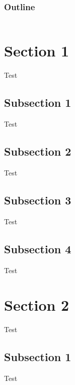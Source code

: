 \documentclass[compress,14pt,t]{beamer}
\begin{document}
\begin{frame}
    \frametitle{Outline}
    \begin{columns}[t]
        \begin{column}{.5\textwidth}
            \tableofcontents[sections={1-3}]
        \end{column}
        \begin{column}{.5\textwidth}
            \tableofcontents[sections={4-5}]
        \end{column}
    \end{columns}
\end{frame}

    \section{Section 1}
    \begin{frame}Test\end{frame}
    \subsection{Subsection 1}
    \begin{frame}Test\end{frame}
    \subsection{Subsection 2}
    \begin{frame}Test\end{frame}
    \subsection{Subsection 3}
    \begin{frame}Test\end{frame}
    \subsection{Subsection 4}
    \begin{frame}Test\end{frame}

    \section{Section 2}
    \begin{frame}Test\end{frame}
    \subsection{Subsection 1}
    \begin{frame}Test\end{frame}
\end{document}
